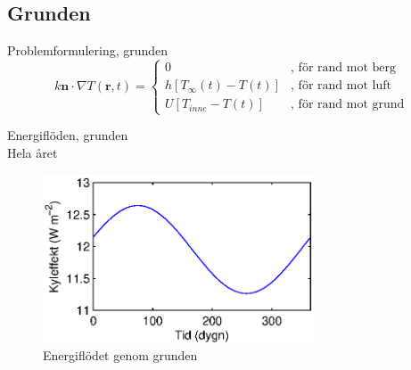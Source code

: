 \subsection{Grunden}

\begin{frame}{Problemformulering, grunden}
\begin{equation*}
k\mathbf{n}\cdot\nabla T(\mathbf{r},t) = 
\begin{cases}
0&\mbox{, för rand mot berg} \\
h[T_\infty(t)-T(t)]&\mbox{, för rand mot luft} \\
U[T_{inne} - T(t)]&\mbox{, för rand mot grund}
\end{cases}
\end{equation*}


\end{frame}

\begin{frame}{Energiflöden, grunden\\Hela året}

\begin{figure}[hpbt]
\centering
\includegraphics[height=5cm]{images/foundation.eps}
\caption*{Energiflödet genom grunden}
\end{figure}

\end{frame}
